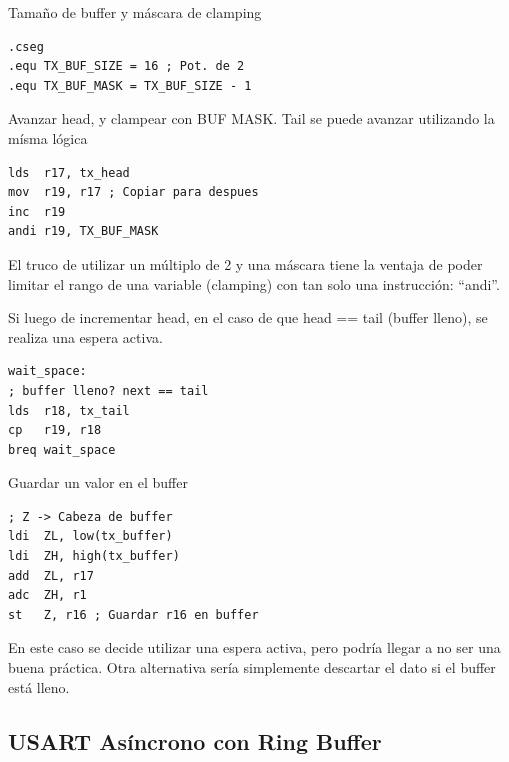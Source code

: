 Tamaño de buffer y máscara de clamping
\begin{verbatim}
.cseg
.equ TX_BUF_SIZE = 16 ; Pot. de 2
.equ TX_BUF_MASK = TX_BUF_SIZE - 1
\end{verbatim}

Avanzar head, y clampear con BUF MASK. Tail se puede avanzar utilizando la mísma lógica
\begin{verbatim}
lds  r17, tx_head
mov  r19, r17 ; Copiar para despues
inc  r19
andi r19, TX_BUF_MASK
\end{verbatim}

El truco de utilizar un múltiplo de 2 y una máscara tiene la ventaja de poder limitar el rango de una variable (clamping) con tan solo una instrucción: ``andi''. 

Si luego de incrementar head, en el caso de que head == tail (buffer lleno), se realiza una espera activa. 
\begin{verbatim}
wait_space: 
; buffer lleno? next == tail
lds  r18, tx_tail
cp   r19, r18
breq wait_space
\end{verbatim}

Guardar un valor en el buffer
\begin{verbatim}
; Z -> Cabeza de buffer
ldi  ZL, low(tx_buffer)
ldi  ZH, high(tx_buffer)
add  ZL, r17 
adc  ZH, r1
st   Z, r16 ; Guardar r16 en buffer
\end{verbatim}

En este caso se decide utilizar una espera activa, pero podría llegar a no ser una buena práctica. Otra alternativa sería simplemente descartar el dato si el buffer está lleno.

    
\subsection{USART Asíncrono con Ring Buffer}\label{anexo:USART_Asincrono_con_Ring_Buffer}

